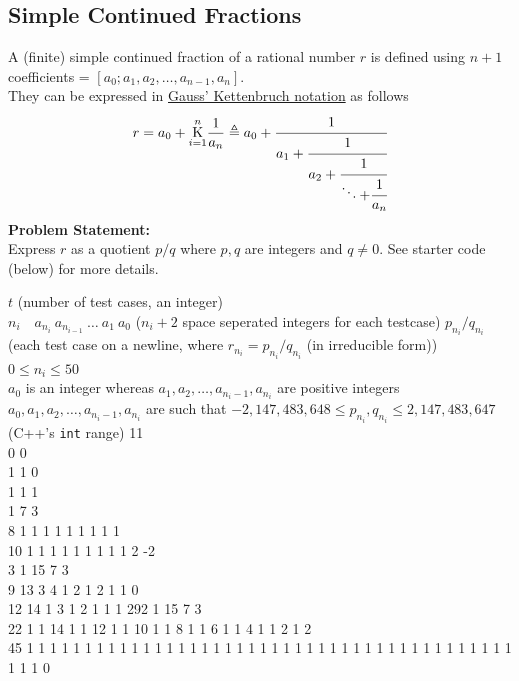 \documentclass[../../Problems]{subfiles}
\begin{document}
\subsection{Simple Continued Fractions}{\label{pp:simplecontinuedfractions}}
{A (finite) simple continued fraction of a rational number $r$ is defined using $n+1$ coefficients = $[a_0; a_1, a_2,\ldots, a_{n-1}, a_n]$.
\\They can be expressed in \href{https://en.wikipedia.org/wiki/Generalized_continued_fraction#Notation}{Gauss' Kettenbruch notation} as follows
\begin{equation}
{ r=a_{0}+{\underset {i=1}{\overset {n }{\mathrm {K} }}}{\frac {1}{a_{n}}}\triangleq a_{0}+{\cfrac {1}{a_{1}+{\cfrac {1}{a_{2}+{\cfrac {1}{\ddots{+{\cfrac{1}{a_n} }}}}}}}} }
\end{equation}
\textbf{Problem Statement:}\\
Express $r$ as a quotient $p/q$ where $p,q$ are integers and $q\neq0$. See starter code (below) for more details.
\begin{testcases}
	{$t$ \hfill(number of test cases, an integer)\\%
	$n_i\quad a_{n_i}\ a_{n_{i-1}}\ \ldots\ a_1\ a_0$ \hfill($n_i+2$ space seperated integers for each testcase)}
	{$p_{n_i}/q_{n_i}$ \hfill(each test case on a newline, where $r_{n_i} = p_{n_i}/q_{n_i}$ (in irreducible form))
	}
	{$0 \leq n_i \leq 50$\\
	$a_{0}$ is an integer whereas $a_1, a_2, \ldots, a_{n_i -1}, a_{n_i}$ are positive integers\\
	$a_0, a_1, a_2, \ldots, a_{n_i -1}, a_{n_i}$ are such that $-2,147,483,648\leq p_{n_i},q_{n_i}\leq2,147,483,647$\hfill(C++'s \texttt{int} range)%
	}
	{11\\0 0\\1 1 0\\1 1 1\\1 7 3\\8 1 1 1 1 1 1 1 1 1\\10 1 1 1 1 1 1 1 1 1 2 -2\\3 1 15 7 3\\9 13 3 4 1 2 1 2 1 1 0\\12 14 1 3 1 2 1 1 1 292 1 15 7 3\\22 1 1 14 1 1 12 1 1 10 1 1 8 1 1 6 1 1 4 1 1 2 1 2\\45 1 1 1 1 1 1 1 1 1 1 1 1 1 1 1 1 1 1 1 1 1 1 1 1 1 1 1 1 1 1 1 1 1 1 1 1 1 1 1 1 1 1 1 1 1 0}

\end{testcases}}
\end{document}
